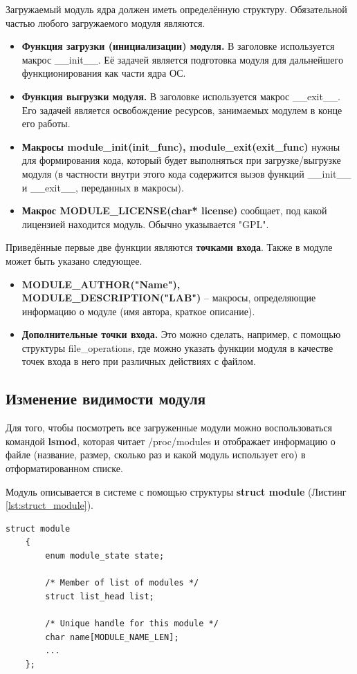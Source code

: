 Загружаемый модуль ядра должен иметь определённую структуру. Обязательной частью любого загружаемого модуля являются.
\begin{itemize}
	\item \textbf{Функция загрузки (инициализации) модуля.} В заголовке используется макрос \_\_init\_\_. Её задачей является подготовка модуля для дальнейшего функционирования как части ядра ОС.
	
	\item \textbf{Функция выгрузки модуля.} В заголовке используется макрос \_\_exit\_\_. Его задачей является освобождение ресурсов, занимаемых модулем в конце его работы. 
	
	\item \textbf{Макросы module\_init(init\_func), module\_exit(exit\_func)} нужны для формирования кода, который будет выполняться при загрузке/выгрузке модуля (в частности внутри этого кода содержится вызов функций \_\_init\_\_ и \_\_exit\_\_, переданных в макросы).
	
	\item \textbf{Макрос MODULE\_LICENSE(char* license)} сообщает, под какой лицензией находится модуль. Обычно указывается "GPL".
\end{itemize}
Приведённые первые две функции являются \textbf{точками входа}. Также в модуле может быть указано следующее.
\begin{itemize}
	\item \textbf{MODULE\_AUTHOR("Name"), MODULE\_DESCRIPTION("LAB")} -- макросы, определяющие информацию о модуле (имя автора, краткое описание).
	
	\item \textbf{Дополнительные точки входа.} Это можно сделать, например, с помощью структуры file\_operations, где можно указать функции модуля в качестве точек входа в него при различных действиях с файлом. \newline
\end{itemize}

\subsection{Изменение видимости модуля}
Для того, чтобы посмотреть все загруженные модули можно воспользоваться командой \textbf{lsmod}, которая читает /proc/modules и отображает информацию о файле (название, размер, сколько раз и какой модуль использует его) в отформатированном списке. \cite{lsmod}

Модуль описывается в системе с помощью структуры \textbf{struct module} (Листинг \ref{lst:struct_module}).
\begin{lstlisting}[caption = {struct module}, label=lst:struct_module]
	struct module
	{
		enum module_state state;
		
		/* Member of list of modules */
		struct list_head list;
		
		/* Unique handle for this module */
		char name[MODULE_NAME_LEN];
		...
	};
\end{lstlisting}

